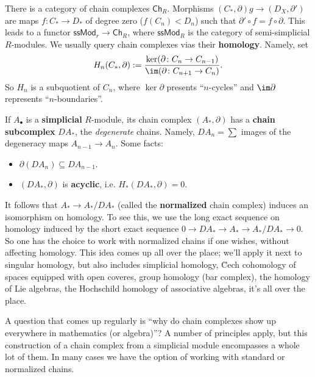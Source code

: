 There is a category of chain complexes $\mathsf{Ch} _R$. Morphisms $(C_*, \partial )g\to (D_X, \partial ')$ are maps $f \colon C_* \to D_*$ of degree zero ($f(C_n )<D_n $) such that $\partial ' \circ f = f \circ \partial $. This leads to a functor $\mathsf{ssMod} _r \to \mathsf{Ch} _R$, where $\mathsf{ssMod} _R$ is the category of semi-simplicial $R$-modules. We usually query chain complexes vias their \textbf{homology}. Namely, set 
\[
    H_n (C_*, \partial ):= \frac{\ker (\partial \colon C_n  \to C_{n-1})}{\im (\partial  \colon C_{n+1} \to C_n) }.
\] So $H_n $ is a subquotient of $C_n $, where $\ker \partial $ presents ``$n$-cycles'' and $\im \partial $ represents ``$n$-boundaries''.
\begin{remark}
    If $A_{\bullet}$ is a \textbf{simplicial} $R$-module, its chain complex $(A_*,\partial )$ has a \textbf{chain subcomplex} $DA_*$, the \emph{degenerate}  chains. Namely, $DA_n =\sum $ images of the degeneracy maps $A_{n-1}\to A_n $. Some facts:
    \begin{itemize}
    \setlength\itemsep{-.2em}
\item $\partial (DA_n ) \subseteq DA_{n-1}$.
\item $(DA_*,\partial )$ is \textbf{acyclic}, i.e. $H_*(DA_*,\partial )=0$.
    \end{itemize}
    It follows that $A_* \to A_* /DA_*$ (called the \textbf{normalized} chain complex) induces an isomorphism on homology. To see this, we use the long exact sequence on homology induced by the short exact sequence $0 \to DA_* \to A_* \to A_* / DA_* \to 0$. So one has the choice to work with normalized chains if one wishes, without affecting homology. This idea comes up all over the place; we'll apply it next to singular homology, but also includes simplicial homology, \u Cech cohomology of spaces equipped with open coveres, group homology (bar complex), the homology of Lie algebras, the Hochschild homology of associative algebras, it's all over the place.

    A question that comes up regularly is ``why do chain complexes show up everywhere in mathematics (or algebra)''? A number of principles apply, but this construction of a chain complex from a simplicial module encompasses a whole lot of them. In many cases we have the option of working with standard or normalized chains.
\end{remark}
